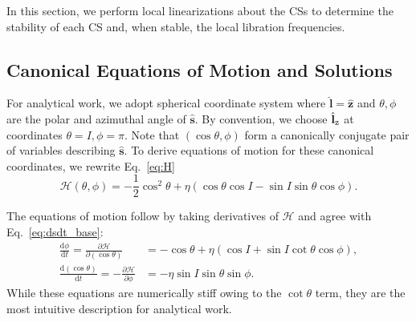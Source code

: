 \documentclass[
        fleqn,
        usenatbib,
        referee,
    ]{mnras}
\newcommand*{\rd}[2]{\frac{\mathrm{d}#1}{\mathrm{d}#2}}
\newcommand*{\pd}[2]{\frac{\partial#1}{\partial#2}}
\newcommand*{\bm}[1]{\boldsymbol{\mathbf{#1}}}
\newcommand*{\uv}[1]{\hat{\bm{#1}}}
\newcommand*{\p}[1]{\left(#1\right)}
\begin{document}
In this section, we perform local linearizations about the CSs to determine the
stability of each CS and, when stable, the local libration frequencies.

\subsection{Canonical Equations of Motion and Solutions}

For analytical work, we adopt spherical coordinate system where $\uv{l} =
\uv{z}$ and $\theta, \phi$ are the polar and azimuthal angle of $\uv{s}$. By
convention, we choose $\uv{l}_{\rm z}$ at coordinates $\theta = I, \phi = \pi$.
Note that $\p{\cos \theta, \phi}$ form a canonically conjugate pair of variables
describing $\uv{s}$. To derive equations of motion for these canonical
coordinates, we rewrite Eq.~\eqref{eq:H}
\begin{equation}
    \mathcal{H}\p{\theta, \phi} = -\frac{1}{2}\cos^2\theta
            + \eta \p{\cos \theta \cos I - \sin I \sin \theta \cos \phi}.
\end{equation}

The equations of motion follow by taking derivatives of $\mathcal{H}$ and agree
with Eq.~\eqref{eq:dsdt_base}:
\begin{subequations}\label{se:H_eom}
    \begin{align}
        \rd{\phi}{t} = \pd{\mathcal{H}}{(\cos\theta)}
            &= -\cos\theta + \eta\p{\cos I + \sin I \cot \theta \cos \phi},
                \label{seq:H_eom_phi_t}\\
        \rd{(\cos \theta)}{t} = -\pd{\mathcal{H}}{\phi}
            &= -\eta \sin I \sin \theta \sin \phi.
                \label{seq:H_eom_mu_t}
    \end{align}
\end{subequations}
While these equations are numerically stiff owing to the $\cot\theta$ term, they
are the most intuitive description for analytical work.
\end{document}
